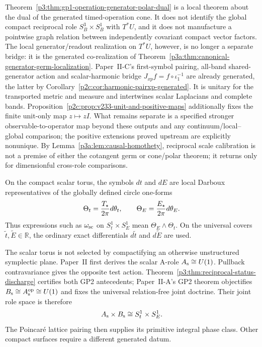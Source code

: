 \documentclass[12pt,a4paper]{article}
\begin{document}
\begin{remark}
\label{p3:rem:polar-dual-not-global-pair}
Theorem~\ref{p3:thm:gp1-operation-generator-polar-dual} is a local theorem
about the dual of the generated timed-operation cone.  It does not identify
the global compact reciprocal role \(S^3_B\times S^1_B\) with \(T^*U\), and
it does not manufacture a pointwise graph relation between independently
covariant compact vector factors.  The local generator/readout realization on
\(T^*U\), however, is no longer a separate bridge: it is the generated
co-realization of Theorem~\ref{p3a:thm:canonical-generator-germ-localization}.
Paper~II-C's first-symbol pairing, all-band shared-generator action and
scalar-harmonic bridge
\(J_{xp}f=f\circ\iota_1^{-1}\) are already generated, the latter by
Corollary~\ref{p2c:cor:harmonic-pairxp-generated}. It is unitary for the
transported metric and measure and intertwines scalar Laplacians and complete
bands. Proposition~\ref{p2c:prop:v233-unit-and-positive-maps} additionally
fixes the finite unit-only map \(z\mapsto zI\). What remains separate is
a specified stronger observable-to-operator map beyond these outputs and any
continuum/local--global comparison; the positive extensions proved upstream
are explicitly nonunique.  By
Lemma~\ref{p3a:lem:causal-homothety}, reciprocal scale calibration is not a
premise of either the cotangent germ or cone/polar theorem; it returns only for
dimensionful cross-role comparisons.
\end{remark}

\begin{remark}
On the compact scalar torus, the symbols \(dt\) and \(dE\) are local Darboux
representatives of the globally defined circle one-forms
\[
        \Theta_t=\frac{T_\star}{2\pi}d\theta_t,
        \qquad
        \Theta_E=\frac{E_\star}{2\pi}d\theta_E .
\]
Thus expressions such as \(\omega_{\rm sc}\) on \(S^1_t\times S^1_E\) mean
\(\Theta_E\wedge\Theta_t\).  On the universal covers
\(\widetilde t,\widetilde E\in\mathbb R\), the ordinary exact differentials
\(d\widetilde t\) and \(d\widetilde E\) are used.
\end{remark}

\begin{remark}
The scalar torus is not selected by compactifying an otherwise unstructured
symplectic plane.  Paper~II first derives the scalar A-role
\(A_{\rm s}\cong U(1)\).  Pullback contravariance gives the opposite test action.
Theorem~\ref{p3:thm:reciprocal-status-discharge} certifies both GP2 antecedents;
Paper~II-A's GP2 theorem objectifies
\(B_{\rm s}\cong A_{\rm s}^{\rm op}\cong U(1)\) and fixes the universal
relation-free joint doctrine.  Their joint role space is therefore
\[
        A_{\rm s}\times B_{\rm s}\cong S^1_t\times S^1_E.
\]
The Poincar\'e lattice pairing then supplies its primitive integral phase
class.  Other compact surfaces require a different generated datum.
\end{remark}
\end{document}
